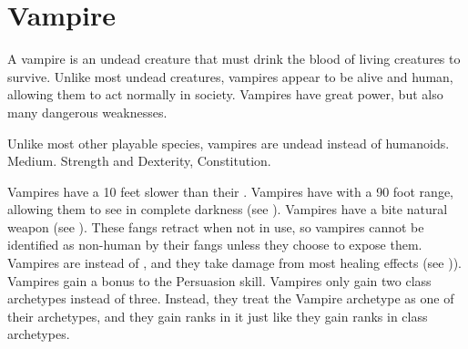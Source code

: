 


\section{Vampire}
    A vampire is an undead creature that must drink the blood of living creatures to survive.
    Unlike most undead creatures, vampires appear to be alive and human, allowing them to act normally in society.
    Vampires have great power, but also many dangerous weaknesses.

     Unlike most other playable species, vampires are undead instead of humanoids.
     Medium.
      Strength and Dexterity,  Constitution.
    \begin{itemize}
         Vampires have a  10 feet slower than their .
         Vampires have  with a 90 foot range, allowing them to see in complete darkness (see ).
         Vampires have a bite natural weapon (see ).
            These fangs retract when not in use, so vampires cannot be identified as non-human by their fangs unless they choose to expose them.
         Vampires are  instead of , and they take damage from most healing effects (see )).
         Vampires gain a  bonus to the Persuasion skill.
         Vampires only gain two class archetypes instead of three.
            Instead, they treat the Vampire archetype as one of their archetypes, and they gain ranks in it just like they gain ranks in class archetypes.
    \end{itemize}


